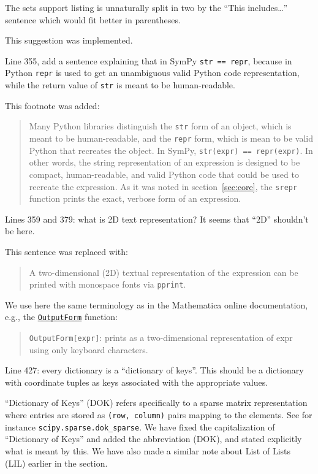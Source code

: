 \documentclass[answers,12pt]{exam}
\begin{document}
\begin{questions}
\begin{solution}
\end{solution}

\question The sets support listing is unnaturally split in two by the ``This includes\ldots'' sentence which would fit better in parentheses.
\begin{solution}
This suggestion was implemented.
\end{solution}

\question Line 355, add a sentence explaining that in SymPy \texttt{str == repr}, because in Python \texttt{repr} is used to get an unambiguous valid Python code representation, while the return value of \texttt{str} is meant to be human-readable.
\begin{solution}
This footnote was added:
\begin{quote}
  Many Python libraries distinguish the \texttt{str} form of an object, which
  is meant to be human-readable, and the \texttt{repr} form, which is mean to
  be valid Python that recreates the object. In SymPy, \texttt{str(expr) ==
    repr(expr)}. In other words, the string representation of an expression is
  designed to be compact, human-readable, and valid Python code that could be
  used to recreate the expression. As it was noted in section~\ref{sec:core},
  the \texttt{srepr} function prints the exact, verbose form of an expression.
\end{quote}
\end{solution}

\question Lines 359 and 379: what is 2D text representation? It seems that ``2D'' shouldn't be here.
\begin{solution}
This sentence was replaced with:
\begin{quote}
A two-dimensional (2D) textual representation of the expression can
be printed with monospace fonts via \verb|pprint|.
\end{quote}
We use here the same terminology as in the Mathematica
online documentation, e.g., the
\href{https://reference.wolfram.com/language/ref/OutputForm.html}{\texttt{OutputForm}}
function:
\begin{quote}
\texttt{OutputForm[expr]}: prints as a two-dimensional representation of expr using only keyboard characters.
\end{quote}
\end{solution}

\question Line 427: every dictionary is a ``dictionary of keys''. This should be a dictionary with coordinate tuples as keys associated with the appropriate values.
\begin{solution}
``Dictionary of Keys'' (DOK) refers specifically to a sparse matrix
representation where entries are stored as \texttt{(row, column)} pairs
mapping to the elements. See for instance \texttt{scipy.sparse.dok\_sparse}. We
have fixed the capitalization of ``Dictionary of Keys'' and added the
abbreviation (DOK), and stated explicitly what is meant by this. We have also
made a similar note about List of Lists (LIL) earlier in the section.
\end{solution}


\end{questions}
\end{document}
